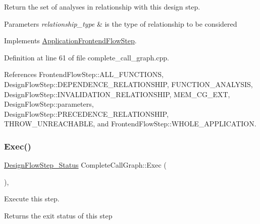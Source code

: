 Return the set of analyses in relationship with this design step. 


\begin{DoxyParams}{Parameters}
{\em relationship\+\_\+type} & is the type of relationship to be considered \\
\hline
\end{DoxyParams}


Implements \hyperlink{classApplicationFrontendFlowStep_ab308200c0096ccff3a1ff50e864ed61f}{Application\+Frontend\+Flow\+Step}.



Definition at line 61 of file complete\+\_\+call\+\_\+graph.\+cpp.



References Frontend\+Flow\+Step\+::\+A\+L\+L\+\_\+\+F\+U\+N\+C\+T\+I\+O\+NS, Design\+Flow\+Step\+::\+D\+E\+P\+E\+N\+D\+E\+N\+C\+E\+\_\+\+R\+E\+L\+A\+T\+I\+O\+N\+S\+H\+IP, F\+U\+N\+C\+T\+I\+O\+N\+\_\+\+A\+N\+A\+L\+Y\+S\+IS, Design\+Flow\+Step\+::\+I\+N\+V\+A\+L\+I\+D\+A\+T\+I\+O\+N\+\_\+\+R\+E\+L\+A\+T\+I\+O\+N\+S\+H\+IP, M\+E\+M\+\_\+\+C\+G\+\_\+\+E\+XT, Design\+Flow\+Step\+::parameters, Design\+Flow\+Step\+::\+P\+R\+E\+C\+E\+D\+E\+N\+C\+E\+\_\+\+R\+E\+L\+A\+T\+I\+O\+N\+S\+H\+IP, T\+H\+R\+O\+W\+\_\+\+U\+N\+R\+E\+A\+C\+H\+A\+B\+LE, and Frontend\+Flow\+Step\+::\+W\+H\+O\+L\+E\+\_\+\+A\+P\+P\+L\+I\+C\+A\+T\+I\+ON.

\mbox{\label{classCompleteCallGraph_adfe7bbc7b2950105a2fd26b29436964e}} 
\subsubsection{\texorpdfstring{Exec()}{Exec()}}
{\footnotesize\ttfamily \hyperlink{design__flow__step_8hpp_afb1f0d73069c26076b8d31dbc8ebecdf}{Design\+Flow\+Step\+\_\+\+Status} Complete\+Call\+Graph\+::\+Exec (\begin{DoxyParamCaption}{ }\end{DoxyParamCaption})\hspace{0.3cm}{\ttfamily [override]}, {\ttfamily [virtual]}}



Execute this step. 

\begin{DoxyReturn}{Returns}
the exit status of this step 
\end{DoxyReturn}


